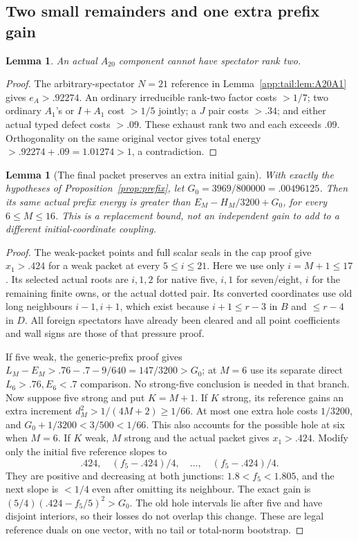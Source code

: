 \documentclass[11pt]{article}
\newtheorem{lemma}[theorem]{Lemma}
\theoremstyle{definition}
\theoremstyle{remark}
\begin{document}
\subsection{Two small remainders and one extra prefix gain}
\label{app:tail:smallremainders}
\begin{lemma}
\label{app:tail:lem:A20ranktwo}
An actual $A_{20}$ component cannot have spectator rank two.
\end{lemma}
\begin{proof}
The arbitrary-spectator $N=21$ reference in
Lemma~\ref{app:tail:lem:A20A1} gives $e_A>.92274$.
An ordinary irreducible rank-two factor costs $>1/7$;
two ordinary $A_1$'s or $I+A_1$ cost $>1/5$ jointly;
a $J$ pair costs $>.34$; and either actual typed defect costs $>.09$.
These exhaust rank two and each exceeds $.09$.
Orthogonality on the same original vector gives total energy
$>.92274+.09=1.01274>1$, a contradiction.
\end{proof}

\begin{lemma}[The final packet preserves an extra initial gain]
\label{app:tail:lem:prefixgain}
With exactly the hypotheses of Proposition~\ref{prop:prefix}, let
$G_0=3969/800000=.00496125$. Then its same actual prefix energy is
greater than $E_M-H_M/3200+G_0$, for every $6\le M\le16$.
This is a replacement bound, not an independent gain to add to a
different initial-coordinate coupling.
\end{lemma}
\begin{proof}
The weak-packet points and full scalar seals in the cap proof give
$x_1>.424$ for a weak packet at every $5\le i\le21$.
Here we use only $i=M+1\le17$. Its selected actual roots are
$i,1,2$ for native five, $i,1$ for seven/eight, $i$ for the
remaining finite owns, or the actual dotted pair. Its converted
coordinates use old long neighbours $i-1,i+1$, which exist because
$i+1\le r-3$ in $B$ and $\le r-4$ in $D$.
All foreign spectators have already been cleared and all point
coefficients and wall signs are those of that pressure proof.

If five weak, the generic-prefix proof gives
$L_M-E_M>.76-.7-9/640=147/3200>G_0$; at $M=6$ use its
separate direct $L_6>.76,E_6<.7$ comparison. No strong-five
conclusion is needed in that branch.
Now suppose five strong and put $K=M+1$.
If $K$ strong, its reference gains an extra increment
$d_M^2>1/(4M+2)\ge1/66$. At most one extra hole costs
$1/3200$, and $G_0+1/3200<3/500<1/66$.
This also accounts for the possible hole at six when $M=6$.
If $K$ weak, $M$ strong and the actual packet gives $x_1>.424$.
Modify only the initial five reference slopes to
\[
 .424,\quad(f_5-.424)/4,\quad\ldots,\quad(f_5-.424)/4.
\]
They are positive and decreasing at both junctions: $1.8<f_5<1.805$,
and the next slope is $<1/4$ even after omitting its neighbour.
The exact gain is $(5/4)(.424-f_5/5)^2>G_0$.
The old hole intervals lie after five and have disjoint interiors,
so their losses do not overlap this change. These are legal reference
duals on one vector, with no tail or total-norm bootstrap.
\end{proof}
\end{document}
